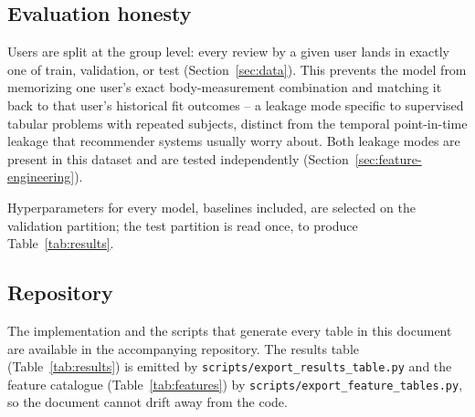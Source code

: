 \subsection{Evaluation honesty}

Users are split at the group level: every review by a given user lands in
exactly one of train, validation, or test
(Section~\ref{sec:data}). This prevents the model from memorizing one user's
exact body-measurement combination and matching it back to that user's
historical fit outcomes -- a leakage mode specific to supervised tabular
problems with repeated subjects, distinct from the temporal point-in-time
leakage that recommender systems usually worry about. Both leakage modes are
present in this dataset and are tested independently
(Section~\ref{sec:feature-engineering}).

Hyperparameters for every model, baselines included, are selected on the
validation partition; the test partition is read once, to produce
Table~\ref{tab:results}.

\subsection{Repository}

The implementation and the scripts that generate every table in this
document are available in the accompanying repository. The results table
(Table~\ref{tab:results}) is emitted by
\texttt{scripts/export\_results\_table.py} and the feature catalogue
(Table~\ref{tab:features}) by \texttt{scripts/export\_feature\_tables.py}, so
the document cannot drift away from the code.
